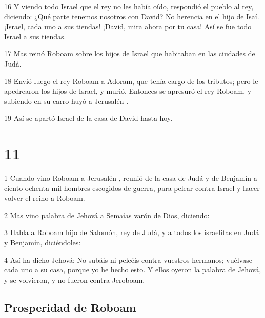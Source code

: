 \par 16 Y viendo todo Israel que el rey no les había oído, respondió el pueblo al rey, diciendo: ¿Qué parte tenemos nosotros con David? No herencia en el hijo de Isaí. ¡Israel, cada uno a sus tiendas! ¡David, mira ahora por tu casa! Así se fue todo Israel a sus tiendas.
\par 17 Mas reinó Roboam sobre los hijos de Israel que habitaban en las ciudades de Judá.
\par 18 Envió luego el rey Roboam a Adoram, que tenía cargo de los tributos; pero le apedrearon los hijos de Israel, y murió. Entonces se apresuró el rey Roboam, y subiendo en su carro huyó a Jerusalén .
\par 19 Así se apartó Israel de la casa de David hasta hoy.

\chapter{11}

\par 1 Cuando vino Roboam a Jerusalén , reunió de la casa de Judá y de Benjamín a ciento  ochenta mil hombres escogidos de guerra, para pelear contra Israel y hacer volver el reino a Roboam.
\par 2 Mas vino palabra de Jehová a Semaías varón de Dios, diciendo:
\par 3 Habla a Roboam hijo de Salomón, rey de Judá, y a todos los israelitas en Judá y Benjamín, diciéndoles:
\par 4 Así ha dicho Jehová: No subáis ni peleéis contra vuestros hermanos; vuélvase cada uno a su casa, porque yo he hecho esto. Y ellos oyeron la palabra de Jehová, y se volvieron, y no fueron contra Jeroboam.

\section*{Prosperidad de Roboam}

